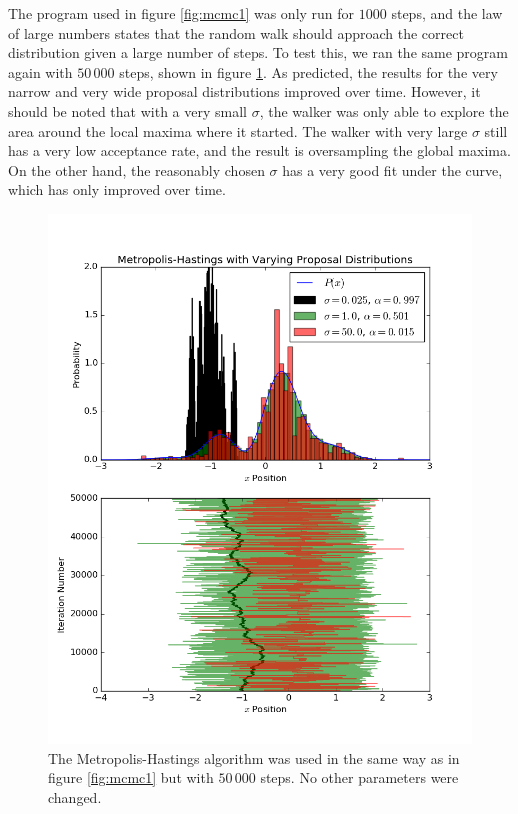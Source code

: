 \documentclass[twocolumn]{article}
\begin{document}
The program used in figure \ref{fig:mcmc1} was only run for $1000$ steps, and
the law of large numbers states that the random walk should approach the correct
distribution given a large number of steps. To test this, we ran the same
program again with $50\,000$ steps, shown in figure \ref{fig:mcmc2}. As
predicted, the results for the very narrow and very wide proposal distributions
improved over time. However, it should be noted that with a very small $\sigma$,
the walker was only able to explore the area around the local maxima where it
started. The walker with very large $\sigma$ still has a very low acceptance
rate, and the result is oversampling the global maxima. On the other hand, the
reasonably chosen $\sigma$ has a very good fit under the curve, which has only
improved over time.

\begin{figure}[p]
	\centering
	\includegraphics[width=\linewidth]{mcmc2.png}
	\caption{
		The Metropolis-Hastings algorithm was used in the same way as in figure
		\ref{fig:mcmc1} but with $50\,000$ steps. No other parameters were changed.
	}
	\label{fig:mcmc2}
\end{figure}
\end{document}
